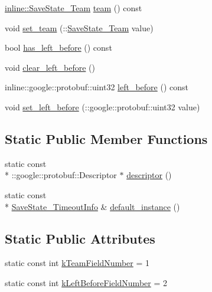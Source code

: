 \begin{DoxyCompactItemize}
\item 
\hyperlink{savestate_8pb_8h_a4b014fc7586e8ed50211fe26dace5b8c}{inline\-::\-Save\-State\-\_\-\-Team} \hyperlink{class_save_state___timeout_info_ae1e7fbff514dd41082540581db9c5a0c}{team} () const 
\item 
void \hyperlink{class_save_state___timeout_info_a0999a9f72062e01d8467777957384470}{set\-\_\-team} (\-::\hyperlink{savestate_8pb_8h_a4b014fc7586e8ed50211fe26dace5b8c}{Save\-State\-\_\-\-Team} value)
\item 
bool \hyperlink{class_save_state___timeout_info_af97559e8ab64a443c59cadc0c2627e8c}{has\-\_\-left\-\_\-before} () const 
\item 
void \hyperlink{class_save_state___timeout_info_a4e341b061620df648b78874c4b62ca99}{clear\-\_\-left\-\_\-before} ()
\item 
inline\-::google\-::protobuf\-::uint32 \hyperlink{class_save_state___timeout_info_add5888ef5e765bf800c001d5e39d67c5}{left\-\_\-before} () const 
\item 
void \hyperlink{class_save_state___timeout_info_a0f396137a60000fbbb086411098a401b}{set\-\_\-left\-\_\-before} (\-::google\-::protobuf\-::uint32 value)
\end{DoxyCompactItemize}
\subsection*{Static Public Member Functions}
\begin{DoxyCompactItemize}
\item 
static const \\*
\-::google\-::protobuf\-::\-Descriptor $\ast$ \hyperlink{class_save_state___timeout_info_a32b9094ee8d97953a426fc2efb78ed5d}{descriptor} ()
\item 
static const \\*
\hyperlink{class_save_state___timeout_info}{Save\-State\-\_\-\-Timeout\-Info} \& \hyperlink{class_save_state___timeout_info_a2a08958af15e936d204d12bb952e3865}{default\-\_\-instance} ()
\end{DoxyCompactItemize}
\subsection*{Static Public Attributes}
\begin{DoxyCompactItemize}
\item 
static const int \hyperlink{class_save_state___timeout_info_a010ea3f69167e27cd6701b644d251ea3}{k\-Team\-Field\-Number} = 1
\item 
static const int \hyperlink{class_save_state___timeout_info_a099e2d88e44c237cc57b3b7047d6bd83}{k\-Left\-Before\-Field\-Number} = 2
\end{DoxyCompactItemize}
